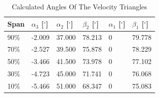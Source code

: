 \begin{table}[H]
\centering
    \begin{tabular}{|l|l|l|l|l|l|}
        \hline
        Span & $\alpha_3$ [$^\circ$] & $\alpha_2$ [$^\circ$] & $\beta_2$ [$^\circ$] & $\alpha_1$ [$^\circ$] & $\beta_1$ [$^\circ$] \\ \hline
        90\%  & -2.009                & 37.000                & 78.213               & 0                     & 79.778               \\ 
        70\%  & -2.527                & 39.500                & 75.878               & 0                     & 78.229               \\ 
        50\%  & -3.466                & 41.500                & 73.978               & 0                     & 77.102               \\ 
        30\%  & -4.723                & 45.000                & 71.741               & 0                     & 76.068               \\ 
        10\%  & -5.466                & 51.000                & 68.347               & 0                     & 75.083               \\
        \hline
    \end{tabular}
\caption{Calculated Angles Of The Velocity Triangles}
\label{tab:t3}
\end{table}


